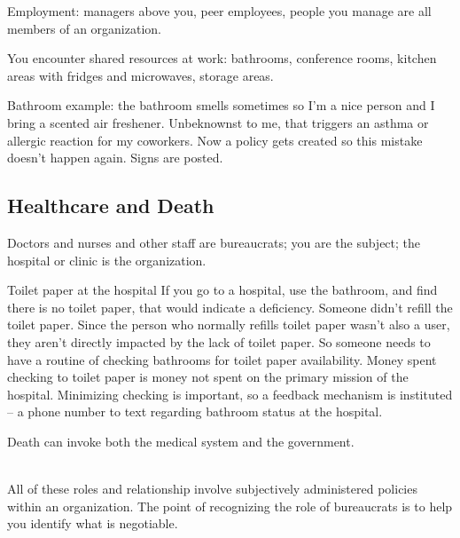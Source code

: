 Employment: managers above you, peer employees, people you manage are all members of an organization. 


You encounter shared resources at work: bathrooms, conference rooms, kitchen areas with fridges and microwaves, storage areas. 

Bathroom example: the bathroom smells sometimes so I'm a nice person and I bring a scented air freshener. Unbeknownst to me, that triggers an asthma or allergic reaction for my coworkers. Now a policy gets created so this mistake doesn't happen again. Signs are posted. 


\subsection*{Healthcare and Death\label{sec:bureaucracy-of-death}}
Doctors and nurses and other staff are bureaucrats; you are the subject; the hospital or clinic is the organization. 


Toilet paper at the hospital
If you go to a hospital, use the bathroom, and find there is no toilet paper, that would indicate a deficiency.
Someone didn't refill the toilet paper. Since the person who normally refills toilet paper wasn't also a user, they aren't directly impacted by the lack of toilet paper.
So someone needs to have a routine of checking bathrooms for toilet paper availability. Money spent checking to toilet paper is money not spent on the primary mission of the hospital.
Minimizing checking is important, so a feedback mechanism is instituted -- a phone number to text regarding bathroom status at the hospital.



Death can invoke both the medical system and the government. 



\ \\

All of these roles and relationship involve subjectively administered policies within an organization. The point of recognizing the role of bureaucrats is to help you identify what is negotiable. 


